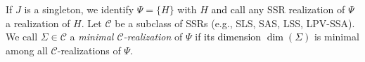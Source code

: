 \documentclass[journal,twoside,web]{ieeecolor}
\begin{document}
If $J$ is a singleton, we identify $\Psi=\{H\}$ with $H$ \textcolor{black}{and call} any SSR realization of $\Psi$  a realization of $H$.
Let $\mathscr{C}$ be a subclass of SSRs (e.g., SLS, SAS, LSS, LPV-SSA).
We call $\Sigma\in\mathscr{C}$ a \emph{minimal $\mathscr{C}$-realization} of $\Psi$ if \textcolor{black}{its dimension $\dim(\Sigma)$} is minimal %
among all $\mathscr{C}$-realizations of $\Psi$.


%





\end{document}
